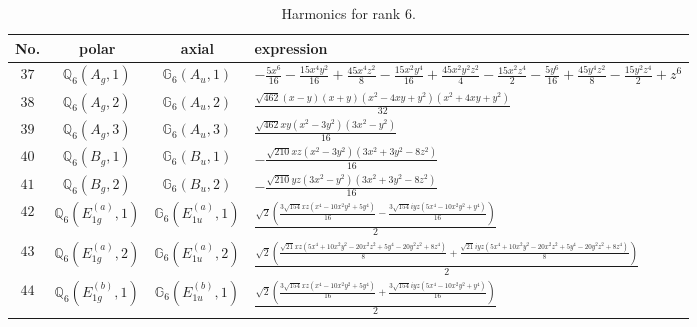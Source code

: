 \documentclass[fleqn,8pt,landscape]{jsarticle}
\begin{document}
\begin{table}[ht!]
\begin{center}
\caption{Harmonics for rank 6.}
\renewcommand{\arraystretch}{1.3}
\begin{tabular}{cccl} \hline \hline
No. & polar & axial & expression \\ \hline
$ 37 $ & $ \mathbb{Q}_{6}(A_{g},1) $ & $ \mathbb{G}_{6}(A_{u},1) $ & $ - \frac{5 x^{6}}{16} - \frac{15 x^{4} y^{2}}{16} + \frac{45 x^{4} z^{2}}{8} - \frac{15 x^{2} y^{4}}{16} + \frac{45 x^{2} y^{2} z^{2}}{4} - \frac{15 x^{2} z^{4}}{2} - \frac{5 y^{6}}{16} + \frac{45 y^{4} z^{2}}{8} - \frac{15 y^{2} z^{4}}{2} + z^{6} $ \\
$ 38 $ & $ \mathbb{Q}_{6}(A_{g},2) $ & $ \mathbb{G}_{6}(A_{u},2) $ & $ \frac{\sqrt{462} \left(x - y\right) \left(x + y\right) \left(x^{2} - 4 x y + y^{2}\right) \left(x^{2} + 4 x y + y^{2}\right)}{32} $ \\
$ 39 $ & $ \mathbb{Q}_{6}(A_{g},3) $ & $ \mathbb{G}_{6}(A_{u},3) $ & $ \frac{\sqrt{462} x y \left(x^{2} - 3 y^{2}\right) \left(3 x^{2} - y^{2}\right)}{16} $ \\
$ 40 $ & $ \mathbb{Q}_{6}(B_{g},1) $ & $ \mathbb{G}_{6}(B_{u},1) $ & $ - \frac{\sqrt{210} x z \left(x^{2} - 3 y^{2}\right) \left(3 x^{2} + 3 y^{2} - 8 z^{2}\right)}{16} $ \\
$ 41 $ & $ \mathbb{Q}_{6}(B_{g},2) $ & $ \mathbb{G}_{6}(B_{u},2) $ & $ - \frac{\sqrt{210} y z \left(3 x^{2} - y^{2}\right) \left(3 x^{2} + 3 y^{2} - 8 z^{2}\right)}{16} $ \\
$ 42 $ & $ \mathbb{Q}_{6}(E_{1g}^{(a)},1) $ & $ \mathbb{G}_{6}(E_{1u}^{(a)},1) $ & $ \frac{\sqrt{2} \left(\frac{3 \sqrt{154} x z \left(x^{4} - 10 x^{2} y^{2} + 5 y^{4}\right)}{16} - \frac{3 \sqrt{154} i y z \left(5 x^{4} - 10 x^{2} y^{2} + y^{4}\right)}{16}\right)}{2} $ \\
$ 43 $ & $ \mathbb{Q}_{6}(E_{1g}^{(a)},2) $ & $ \mathbb{G}_{6}(E_{1u}^{(a)},2) $ & $ \frac{\sqrt{2} \left(\frac{\sqrt{21} x z \left(5 x^{4} + 10 x^{2} y^{2} - 20 x^{2} z^{2} + 5 y^{4} - 20 y^{2} z^{2} + 8 z^{4}\right)}{8} + \frac{\sqrt{21} i y z \left(5 x^{4} + 10 x^{2} y^{2} - 20 x^{2} z^{2} + 5 y^{4} - 20 y^{2} z^{2} + 8 z^{4}\right)}{8}\right)}{2} $ \\
$ 44 $ & $ \mathbb{Q}_{6}(E_{1g}^{(b)},1) $ & $ \mathbb{G}_{6}(E_{1u}^{(b)},1) $ & $ \frac{\sqrt{2} \left(\frac{3 \sqrt{154} x z \left(x^{4} - 10 x^{2} y^{2} + 5 y^{4}\right)}{16} + \frac{3 \sqrt{154} i y z \left(5 x^{4} - 10 x^{2} y^{2} + y^{4}\right)}{16}\right)}{2} $ \\

\end{tabular}
\end{center}
\end{table}
\end{document}
